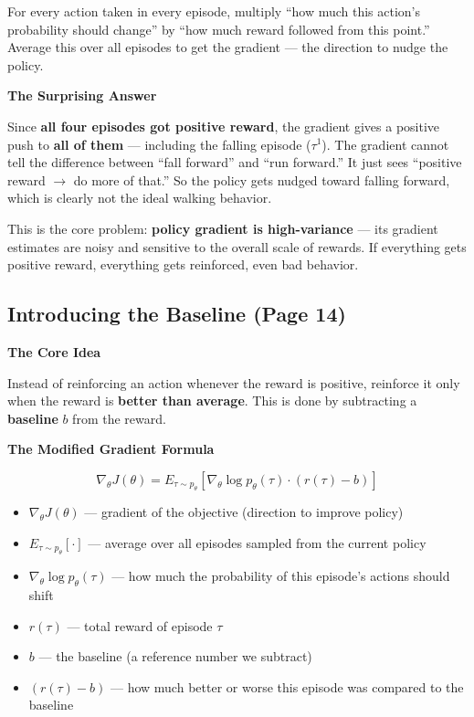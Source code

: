 For every action taken in every episode, multiply ``how much this action's probability should
change'' by ``how much reward followed from this point.'' Average this over all episodes to get the
gradient --- the direction to nudge the policy.

\textbf{The Surprising Answer}

Since \textbf{all four episodes got positive reward}, the gradient gives a positive push to
\textbf{all of them} --- including the falling episode ($\tau^1$). The gradient cannot tell the
difference between ``fall forward'' and ``run forward.'' It just sees ``positive reward $\to$ do
more of that.'' So the policy gets nudged toward falling forward, which is clearly not the ideal
walking behavior.

This is the core problem: \textbf{policy gradient is high-variance} --- its gradient estimates are
noisy and sensitive to the overall scale of rewards. If everything gets positive reward, everything
gets reinforced, even bad behavior.

\subsection{Introducing the Baseline (Page 14)}

\textbf{The Core Idea}

Instead of reinforcing an action whenever the reward is positive, reinforce it only when the reward
is \textbf{better than average}. This is done by subtracting a \textbf{baseline} $b$ from the
reward.

\textbf{The Modified Gradient Formula}

\[
\nabla_\theta J(\theta)
=
E_{\tau \sim p_\theta}
\left[
  \nabla_\theta \log p_\theta(\tau) \cdot (r(\tau) - b)
\right]
\]

\begin{itemize}
  \item $\nabla_\theta J(\theta)$ --- gradient of the objective (direction to improve policy)
  \item $E_{\tau \sim p_\theta}[\cdot]$ --- average over all episodes sampled from the current
    policy
  \item $\nabla_\theta \log p_\theta(\tau)$ --- how much the probability of this episode's actions
    should shift
  \item $r(\tau)$ --- total reward of episode $\tau$
  \item $b$ --- the baseline (a reference number we subtract)
  \item $(r(\tau) - b)$ --- how much better or worse this episode was compared to the baseline
\end{itemize}

